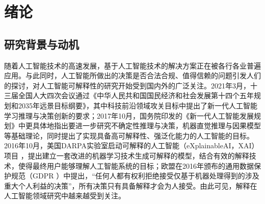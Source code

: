 \chapter{绪论}
\label{chp:introsuction}


\section{研究背景与动机}
随着人工智能技术的高速发展，基于人工智能技术的解决方案正在被各行各业普遍应用。与此同时，人工智能所做出的决策是否合法合规、值得信赖的问题引发人们的探讨，对人工智能可解释性的研究开始受到国内外的广泛关注。2021年3月，十三届全国人大四次会议通过《中华人民共和国国民经济和社会发展第十四个五年规划和2035年远景目标纲要》\cite{guowuyuan2021shisiwu}，其中科技前沿领域攻关目标中提出了新一代人工智能学习推理与决策创新的要求；2017年10月，国务院印发的《新一代人工智能发展规划》\cite{guowuyuan2017aiplan}中更具体地指出要进一步研究不确定性推理与决策，机器直觉推理与因果模型等基础理论，同时提出了实现具备高可解释性、强泛化能力的人工智能的目标。2016年10月，美国DARPA实验室启动可解释的人工智能（eXplainableAI，XAI）项目\cite{gunning2017explainable} ，提出建立一套改进的机器学习技术生成可解释的模型，结合有效的解释技术，使得最终用户能够理解人工智能系统的目标；欧盟在2016年颁布的通用数据保护规范（GDPR\cite{regulation2016regulation} ）中提出，“任何人都有权利拒绝接受仅基于机器处理得到的涉及重大个人利益的决策”，所有决策只有具备解释才会为人接受\cite{goodman2017european}。由此可见，解释在人工智能领域研究中越来越受到关注。

